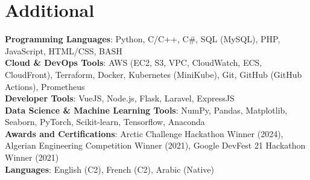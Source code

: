 \documentclass[letterpaper,11t]{article}
\begin{document}
%
\section{Additional}
    \begin{itemize}[leftmargin=0.15in, label={}]
        \small{\item{
        \textbf{Programming Languages}{: Python, C/C++, C\#, SQL (MySQL), PHP, JavaScript, HTML/CSS, BASH} \\
        \textbf{Cloud \& DevOps Tools}{: AWS (EC2, S3, VPC, CloudWatch, ECS, CloudFront), Terraform, Docker, Kubernetes (MiniKube), Git, GitHub (GitHub Actions), Prometheus} \\
        \textbf{Developer Tools}{: VueJS, Node.js, Flask, Laravel, ExpressJS} \\
        \textbf{Data Science \& Machine Learning Tools}{: NumPy, Pandas, Matplotlib, Seaborn, PyTorch, Scikit-learn, Tensorflow, Anaconda } \\
        \textbf{Awards and Certifications}{: Arctic Challenge Hackathon Winner (2024), Algerian Engineering Competition Winner (2021), Google DevFest 21 Hackathon Winner (2021)}\\
        \textbf{Languages}{: English (C2), French (C2), Arabic (Native)} \\
        }}
    \end{itemize}


\end{document}
